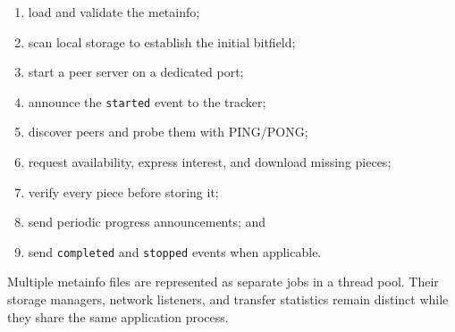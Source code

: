 \begin{enumerate}
  \item load and validate the metainfo;
  \item scan local storage to establish the initial bitfield;
  \item start a peer server on a dedicated port;
  \item announce the \texttt{started} event to the tracker;
  \item discover peers and probe them with PING/PONG;
  \item request availability, express interest, and download missing pieces;
  \item verify every piece before storing it;
  \item send periodic progress announcements; and
  \item send \texttt{completed} and \texttt{stopped} events when applicable.
\end{enumerate}

Multiple metainfo files are represented as separate jobs in a thread pool. Their storage managers, network listeners, and transfer statistics remain distinct while they share the same application process.
